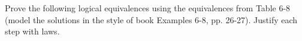 \documentclass[12pt]{exam}
\newenvironment{my_parts}{
\begin{parts}
    \setlength{\itemsep}{1pt}
    \setlength{\parskip}{0pt}
    \setlength{\parsep}{0pt}
}{\end{parts}}
\begin{document}
\begin{questions}
\begin{solution}

 \end{solution}

\question[14] Prove the following logical equivalences using the
equivalences from Table 6-8 (model the solutions in the style of
book Examples 6-8, pp. 26-27).  Justify each step with laws.
    \begin{solution}
    \begin{my_parts}

\end{my_parts}
\end{solution}
\end{questions}
\end{document}
